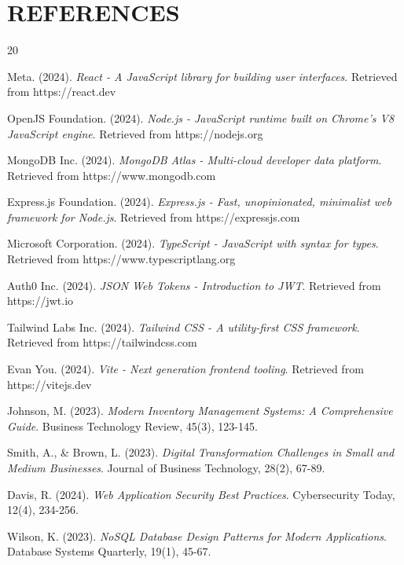 \chapter*{REFERENCES}

\begin{thebibliography}{20}

Meta. (2024). \textit{React - A JavaScript library for building user interfaces}. Retrieved from https://react.dev

OpenJS Foundation. (2024). \textit{Node.js - JavaScript runtime built on Chrome's V8 JavaScript engine}. Retrieved from https://nodejs.org

MongoDB Inc. (2024). \textit{MongoDB Atlas - Multi-cloud developer data platform}. Retrieved from https://www.mongodb.com

Express.js Foundation. (2024). \textit{Express.js - Fast, unopinionated, minimalist web framework for Node.js}. Retrieved from https://expressjs.com

Microsoft Corporation. (2024). \textit{TypeScript - JavaScript with syntax for types}. Retrieved from https://www.typescriptlang.org

Auth0 Inc. (2024). \textit{JSON Web Tokens - Introduction to JWT}. Retrieved from https://jwt.io

Tailwind Labs Inc. (2024). \textit{Tailwind CSS - A utility-first CSS framework}. Retrieved from https://tailwindcss.com

Evan You. (2024). \textit{Vite - Next generation frontend tooling}. Retrieved from https://vitejs.dev

Johnson, M. (2023). \textit{Modern Inventory Management Systems: A Comprehensive Guide}. Business Technology Review, 45(3), 123-145.

Smith, A., \& Brown, L. (2023). \textit{Digital Transformation Challenges in Small and Medium Businesses}. Journal of Business Technology, 28(2), 67-89.

Davis, R. (2024). \textit{Web Application Security Best Practices}. Cybersecurity Today, 12(4), 234-256.

Wilson, K. (2023). \textit{NoSQL Database Design Patterns for Modern Applications}. Database Systems Quarterly, 19(1), 45-67.


\end{thebibliography}
